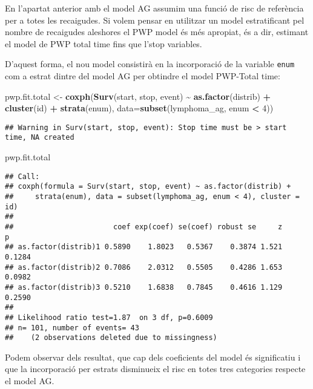\documentclass[
]{article}
\newenvironment{Shaded}{\begin{snugshade}}{\end{snugshade}}
\newcommand{\AttributeTok}[1]{\textcolor[rgb]{0.13,0.29,0.53}{#1}}
\newcommand{\DecValTok}[1]{\textcolor[rgb]{0.00,0.00,0.81}{#1}}
\newcommand{\FunctionTok}[1]{\textcolor[rgb]{0.13,0.29,0.53}{\textbf{#1}}}
\newcommand{\NormalTok}[1]{#1}
\newcommand{\OtherTok}[1]{\textcolor[rgb]{0.56,0.35,0.01}{#1}}
\newcommand{\SpecialCharTok}[1]{\textcolor[rgb]{0.81,0.36,0.00}{\textbf{#1}}}
\begin{document}
En l'apartat anterior amb el model AG assumim una funció de risc de
referència per a totes les recaigudes. Si volem pensar en utilitzar un
model estratificant pel nombre de recaigudes aleshores el PWP model és
més apropiat, és a dir, estimant el model de PWP total time fins que
l'stop variables.

D'aquest forma, el nou model consistirà en la incorporació de la
variable \texttt{enum} com a estrat dintre del model AG per obtindre el
model PWP-Total time:

\begin{Shaded}
\begin{Highlighting}[]
\NormalTok{pwp.fit.total }\OtherTok{\textless{}{-}} \FunctionTok{coxph}\NormalTok{(}\FunctionTok{Surv}\NormalTok{(start, stop, event) }\SpecialCharTok{\textasciitilde{}} \FunctionTok{as.factor}\NormalTok{(distrib) }\SpecialCharTok{+} \FunctionTok{cluster}\NormalTok{(id) }\SpecialCharTok{+} \FunctionTok{strata}\NormalTok{(enum), }\AttributeTok{data=}\FunctionTok{subset}\NormalTok{(lymphoma\_ag, enum }\SpecialCharTok{\textless{}} \DecValTok{4}\NormalTok{))}
\end{Highlighting}
\end{Shaded}

\begin{verbatim}
## Warning in Surv(start, stop, event): Stop time must be > start time, NA created
\end{verbatim}

\begin{Shaded}
\begin{Highlighting}[]
\NormalTok{pwp.fit.total}
\end{Highlighting}
\end{Shaded}

\begin{verbatim}
## Call:
## coxph(formula = Surv(start, stop, event) ~ as.factor(distrib) + 
##     strata(enum), data = subset(lymphoma_ag, enum < 4), cluster = id)
## 
##                       coef exp(coef) se(coef) robust se     z      p
## as.factor(distrib)1 0.5890    1.8023   0.5367    0.3874 1.521 0.1284
## as.factor(distrib)2 0.7086    2.0312   0.5505    0.4286 1.653 0.0982
## as.factor(distrib)3 0.5210    1.6838   0.7845    0.4616 1.129 0.2590
## 
## Likelihood ratio test=1.87  on 3 df, p=0.6009
## n= 101, number of events= 43 
##    (2 observations deleted due to missingness)
\end{verbatim}

Podem observar dels resultat, que cap dels coeficients del model és
significatiu i que la incorporació per estrats disminueix el risc en
totes tres categories respecte el model AG.
\end{document}
